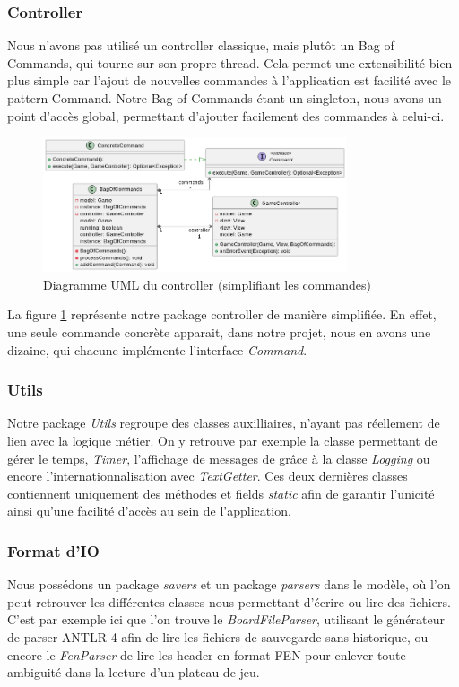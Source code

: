 \documentclass{article}
\begin{document}
\subsubsection{Controller}
Nous n'avons pas utilisé un controller classique, mais plutôt un Bag of Commands, qui tourne sur son propre thread. Cela permet une extensibilité
bien plus simple car l'ajout de nouvelles commandes à l'application est facilité avec le pattern Command.
Notre Bag of Commands étant un singleton, nous avons un point d'accès global, permettant d'ajouter facilement des commandes à celui-ci.
\begin{figure}[h]
    \centering
    \includegraphics[width=0.8\textwidth]{uml_controller}
    \caption{Diagramme UML du controller (simplifiant les commandes)}
    \label{umlController}
\end{figure}
\FloatBarrier
La figure \ref{umlController} représente notre package controller de manière simplifiée. 
En effet, une seule commande concrète apparait, dans notre projet,
nous en avons une dizaine, qui chacune implémente l'interface \textit{Command}.

\subsubsection{Utils}
Notre package \textit{Utils} regroupe des classes auxilliaires, n'ayant pas réellement de lien avec la logique métier.
On y retrouve par exemple la classe permettant de gérer le temps, \textit{Timer}, l'affichage de messages de grâce à la classe \textit{Logging}
ou encore l'internationnalisation avec \textit{TextGetter}. Ces deux dernières classes contiennent uniquement des méthodes et fields \textit{static}
afin de garantir l'unicité ainsi qu'une facilité d'accès au sein de l'application.

\subsubsection{Format d'IO}
Nous possédons un package \textit{savers} et un package \textit{parsers} dans le modèle, où l'on peut retrouver les différentes classes nous permettant d'écrire ou lire des fichiers.
C'est par exemple ici que l'on trouve le \textit{BoardFileParser}, utilisant le générateur de parser ANTLR-4 afin de lire les fichiers de sauvegarde sans historique, ou encore le \textit{FenParser} 
de lire les header en format FEN pour enlever toute ambiguité dans la lecture d'un plateau de jeu.
\end{document}
